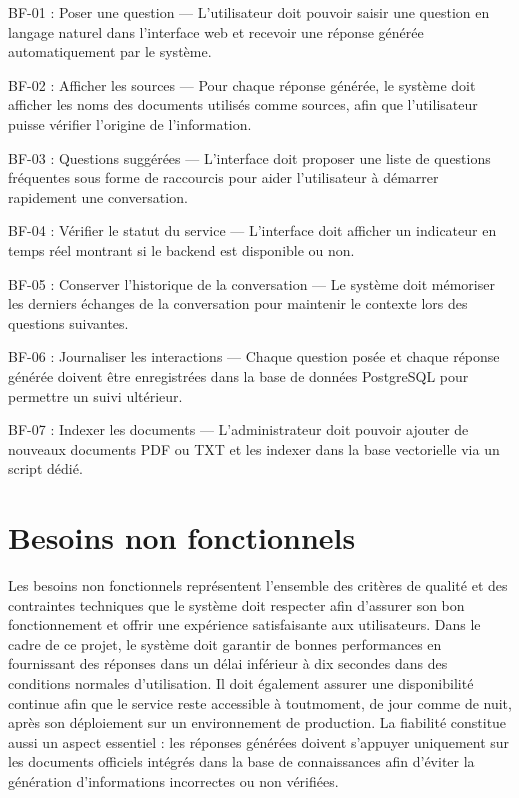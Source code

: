 \documentclass[12pt,a4paper]{report}
\begin{document}
BF-01 : Poser une question — L'utilisateur doit pouvoir saisir une question en langage naturel dans l'interface web et recevoir une réponse générée automatiquement par le système.

BF-02 : Afficher les sources — Pour chaque réponse générée, le système doit afficher les noms des documents utilisés comme sources, afin que l'utilisateur puisse vérifier l'origine de l'information.

BF-03 : Questions suggérées — L'interface doit proposer une liste de questions fréquentes sous forme de raccourcis pour aider l'utilisateur à démarrer rapidement une conversation.

BF-04 : Vérifier le statut du service — L'interface doit afficher un indicateur en temps réel montrant si le backend est disponible ou non.

BF-05 : Conserver l'historique de la conversation — Le système doit mémoriser les derniers échanges de la conversation pour maintenir le contexte lors des questions suivantes.

BF-06 : Journaliser les interactions — Chaque question posée et chaque réponse générée doivent être enregistrées dans la base de données PostgreSQL pour permettre un suivi ultérieur.

BF-07 : Indexer les documents — L'administrateur doit pouvoir ajouter de nouveaux documents PDF ou TXT et les indexer dans la base vectorielle via un script dédié.

\newpage
\section{Besoins non fonctionnels}
Les besoins non fonctionnels représentent l’ensemble des critères de qualité et des contraintes techniques que le système doit respecter afin d’assurer son bon \newline fonctionnement et offrir une expérience satisfaisante aux utilisateurs. Dans le cadre de ce projet, le système doit garantir de bonnes performances en fournissant des réponses dans un délai inférieur à dix secondes dans des conditions normales d’utilisation. Il doit également assurer une disponibilité continue afin que le service reste accessible à tout\newline moment, de jour comme de nuit, après son déploiement sur un environnement de \newline production. La fiabilité constitue aussi un aspect essentiel : les réponses générées doivent s’appuyer uniquement sur les documents officiels intégrés dans la base de connaissances afin d’éviter la génération d’informations incorrectes ou non vérifiées.
\end{document}
